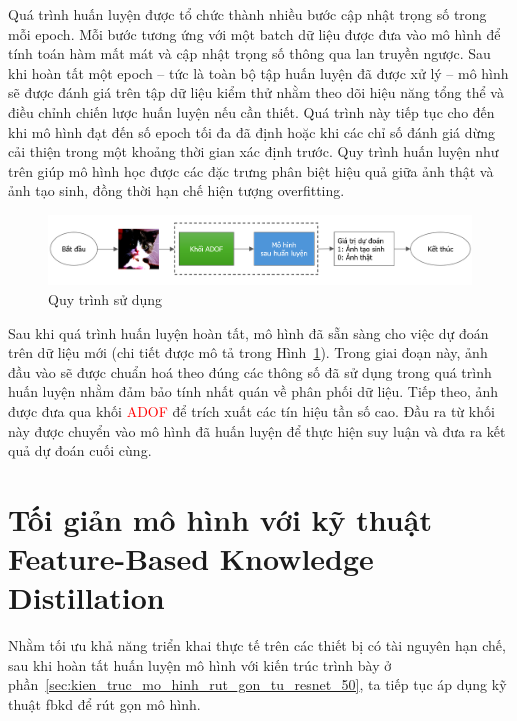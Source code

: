 Quá trình huấn luyện được tổ chức thành nhiều bước cập nhật trọng số trong mỗi \gls{epoch}. Mỗi bước tương ứng với một \gls{batch} dữ liệu được đưa vào mô hình để tính toán hàm mất mát và cập nhật trọng số thông qua lan truyền ngược. Sau khi hoàn tất một \gls{epoch} – tức là toàn bộ tập huấn luyện đã được xử lý – mô hình sẽ được đánh giá trên tập dữ liệu kiểm thử nhằm theo dõi hiệu năng tổng thể và điều chỉnh chiến lược huấn luyện nếu cần thiết. Quá trình này tiếp tục cho đến khi mô hình đạt đến số \gls{epoch} tối đa đã định hoặc khi các chỉ số đánh giá dừng cải thiện trong một khoảng thời gian xác định trước. Quy trình huấn luyện như trên giúp mô hình học được các đặc trưng phân biệt hiệu quả giữa ảnh thật và ảnh tạo sinh, đồng thời hạn chế hiện tượng \gls{overfitting}.
%
%
\begin{figure}[ht!]
	\centering
	\includegraphics[width=1.0\linewidth]{Images/online-serving.png}
	\begin{minipage}{1.0\linewidth}
		\vspace{3mm}
		\caption{Quy trình sử dụng}
		\label{fig:online-serving}
	\end{minipage}
\end{figure}
%
%

Sau khi quá trình huấn luyện hoàn tất, mô hình đã sẵn sàng cho việc dự đoán trên dữ liệu mới (chi tiết được mô tả trong Hình~\ref{fig:online-serving}). Trong giai đoạn này, ảnh đầu vào sẽ được chuẩn hoá theo đúng các thông số đã sử dụng trong quá trình huấn luyện nhằm đảm bảo tính nhất quán về phân phối dữ liệu. Tiếp theo, ảnh được đưa qua khối \textcolor{red}{ADOF} để trích xuất các tín hiệu tần số cao. Đầu ra từ khối này được chuyển vào mô hình đã huấn luyện để thực hiện suy luận và đưa ra kết quả dự đoán cuối cùng.

\section{Tối giản mô hình với kỹ thuật Feature-Based Knowledge Distillation}

Nhằm tối ưu khả năng triển khai thực tế trên các thiết bị có tài nguyên hạn chế, sau khi hoàn tất huấn luyện mô hình với kiến trúc trình bày ở phần~\ref{sec:kien_truc_mo_hinh_rut_gon_tu_resnet_50}, ta tiếp tục áp dụng kỹ thuật \gls{fbkd} để rút gọn mô hình.

